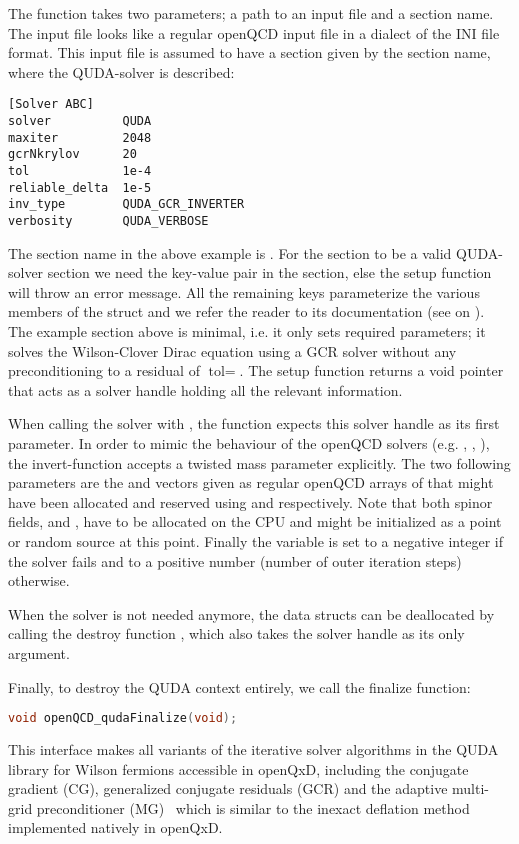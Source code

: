 The function  takes two parameters; a path to an input file and a section name. The input file looks like a regular openQCD input file in a dialect of the INI file format. This input file is assumed to have a section given by the section name, where the QUDA-solver is described:

\begin{lstlisting}[]
[Solver ABC]
solver          QUDA
maxiter         2048
gcrNkrylov      20
tol             1e-4
reliable_delta  1e-5
inv_type        QUDA_GCR_INVERTER
verbosity       QUDA_VERBOSE
\end{lstlisting}

The section name in the above example is . For the section to be a valid QUDA-solver section we need the key-value pair  in the section, else the setup function will throw an error message. All the remaining keys parameterize the various members of the struct  and we refer the reader to its documentation (see  on \cite{QUDApaper}). The example section above is minimal, i.e. it only sets required parameters; it solves the Wilson-Clover Dirac equation using a GCR solver without any preconditioning to a residual of $\text{tol} = $. The setup function  returns a void pointer that acts as a solver handle holding all the relevant information.

When calling the solver with , the function expects this solver handle as its first parameter. In order to mimic the behaviour of the openQCD solvers (e.g. , , ), the invert-function accepts a twisted mass parameter  explicitly. The two following parameters are the  and  vectors given as regular openQCD arrays of  that might have been allocated and reserved using  and  respectively. Note that both spinor fields,  and , have to be allocated on the CPU and  might be initialized as a point or random source at this point. Finally the  variable is set to a negative integer if the solver fails and to a positive number (number of outer iteration steps) otherwise.

When the solver is not needed anymore, the data structs can be deallocated by calling the destroy function , which also takes the solver handle as its only argument.

Finally, to destroy the QUDA context entirely, we call the finalize function:

\begin{lstlisting}[language=C++]
void openQCD_qudaFinalize(void);
\end{lstlisting}

This interface makes all variants of the iterative solver algorithms in the QUDA library for Wilson fermions accessible in openQxD, including the conjugate gradient (CG), generalized conjugate residuals (GCR) and the adaptive multi-grid preconditioner (MG)~\cite{Babich:2010qb} which is similar to the inexact deflation method implemented natively in openQxD. 

